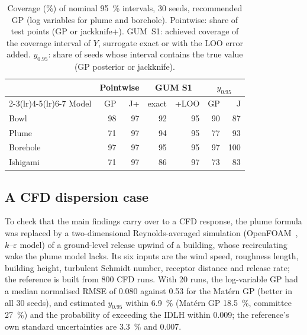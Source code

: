 \documentclass{imeko_wc}
\begin{document}
\begin{table}[tb]
\centering
\caption{Coverage (\%) of nominal \qty{95}{\percent} intervals, 30 seeds,
recommended GP (log variables for plume and borehole). Pointwise: share of
test points (GP or jackknife+). GUM~S1: achieved coverage of the coverage
interval of $Y$, surrogate exact or with the LOO error added. $y_{0.95}$:
share of seeds whose interval contains the true value (GP posterior or
jackknife).}
\label{tab:est}
\setlength{\tabcolsep}{4pt}
\begin{tabular}{lrrrrrr}
\toprule
& \multicolumn{2}{c}{Pointwise} & \multicolumn{2}{c}{GUM S1} &
\multicolumn{2}{c}{$y_{0.95}$}\\
\cmidrule(lr){2-3}\cmidrule(lr){4-5}\cmidrule(lr){6-7}
Model & GP & J+ & exact & +LOO & GP & J\\
\midrule
Bowl  & 98 & 97 & 92 & 95 &  90 &  87\\
Plume    & 71 & 97 & 94 & 95 &  77 &  93\\
Borehole & 97 & 97 & 95 & 95 &  97 & 100\\
Ishigami & 71 & 97 & 86 & 97 &  73 &  83\\
\bottomrule
\end{tabular}
\end{table}

\subsection{A CFD dispersion case}
\label{sec:cfd}
To check that the main findings carry over to a CFD response, the plume
formula was replaced by a two-dimensional Reynolds-averaged simulation
(OpenFOAM~\cite{weller1998}, $k$--$\varepsilon$ model) of a ground-level
release upwind of a building, whose recirculating wake the plume model
lacks. Its six inputs are the wind speed, roughness length, building
height, turbulent Schmidt number, receptor distance and release rate; the
reference is built from 800 CFD runs. With 20 runs, the log-variable GP had
a median normalised RMSE of 0.080 against 0.53 for the Mat\'ern GP (better
in all 30 seeds), and estimated $y_{0.95}$ within \qty{6.9}{\percent} (Mat\'ern
GP \qty{18.5}{\percent}, committee \qty{27}{\percent}) and the probability of
exceeding the IDLH within 0.009; the reference's own standard uncertainties
are \qty{3.3}{\percent} and 0.007.
\end{document}
